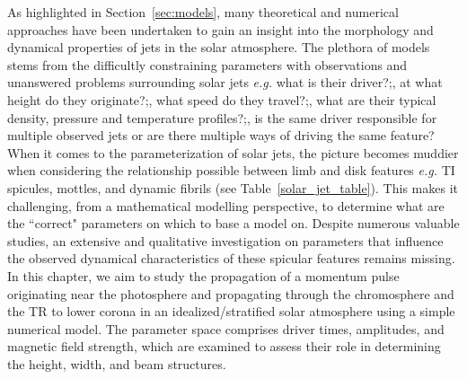 \documentclass[12pt]{ociamthesis}
\begin{document}
As highlighted in Section~\ref{sec:models}, many theoretical and numerical approaches have been undertaken to gain an insight into the morphology and dynamical properties of jets in the solar atmosphere. The plethora of models stems from the difficultly constraining parameters with observations and unanswered problems surrounding solar jets \textit{e.g.} what is their driver?;, at what height do they originate?;, what speed do they travel?;, what are their typical density, pressure and temperature profiles?;, is the same driver responsible for multiple observed jets or are there multiple ways of driving the same feature? When it comes to the parameterization of solar jets, the picture becomes muddier when considering the relationship possible between limb and disk features \textit{e.g.} TI spicules, mottles, and dynamic fibrils (see Table~\ref{solar_jet_table}). This makes it challenging, from a mathematical modelling perspective, to determine what are the ``correct" parameters on which to base a model on. Despite numerous valuable studies, an extensive and qualitative investigation on parameters that influence the observed dynamical characteristics of these spicular features remains missing. In this chapter, we aim to study the propagation of a momentum pulse originating near the photosphere and propagating through the chromosphere and the TR to lower corona in an idealized/stratified solar atmosphere using a simple numerical model. The parameter space comprises driver times, amplitudes, and magnetic field strength, which are examined to assess their role in determining the height, width, and beam structures.
\end{document}

